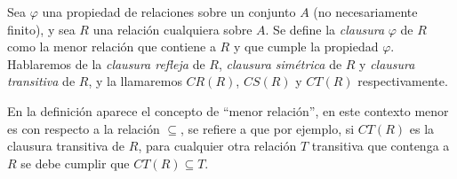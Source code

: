 \begin{definicion}
Sea $\varphi$ una propiedad de relaciones sobre un conjunto $A$ (no necesariamente finito), y sea $R$ una relación cualquiera sobre $A$.
Se define la \emph{clausura} $\varphi$ de $R$ como la menor relación que contiene a $R$ y que cumple la propiedad $\varphi$.
Hablaremos de la \emph{clausura refleja} de $R$, \emph{clausura simétrica} de $R$ y \emph{clausura transitiva} de $R$, y la llamaremos $CR(R)$, $CS(R)$ y $CT(R)$ respectivamente.

En la definición aparece el concepto de ``menor relación'', en este contexto menor es con respecto a la relación $\subseteq$, se refiere a que por ejemplo, si $CT(R)$ es la clausura transitiva de $R$, para cualquier otra relación $T$ transitiva que contenga a $R$ se debe cumplir que $CT(R)\subseteq T$.
\end{definicion}


